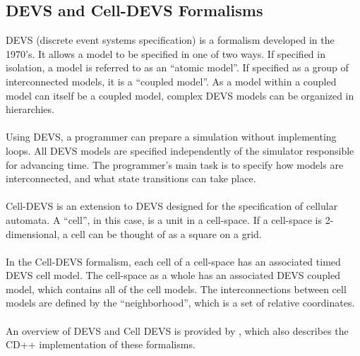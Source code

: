\documentclass{acm_proc_article-sp}
\begin{document}
\subsection{DEVS and Cell-DEVS Formalisms}
DEVS (discrete event systems specification) is a formalism
developed in the 1970's.  It allows a model to be specified
in one of two ways.  If specified in isolation, a model is 
referred to as an ``atomic model''.  If specified as a group of 
interconnected models, it is a ``coupled model''.  As a model 
within a coupled model
can itself be a coupled model, complex DEVS models can be
organized in hierarchies. \\
\\
Using DEVS, a programmer can prepare a simulation without 
implementing loops. All DEVS models are specified independently
of the simulator responsible for advancing time.  The programmer's
main task is to specify how models are interconnected, and what
state transitions can take place.\\
\\
Cell-DEVS is an extension to DEVS designed for the specification 
of cellular automata.  A ``cell'', in this case, is a unit in
a cell-space.  If a cell-space is 2-dimensional, a cell can be
thought of as a square on a grid. \\ 
\\
In the Cell-DEVS formalism, each cell of a cell-space has an
associated timed DEVS cell model.  The cell-space as a whole has
an associated DEVS coupled model, which contains all of the cell
models.  The interconnections between cell models are defined
by the ``neighborhood'', which is a set of relative coordinates. \\
\\
An overview of DEVS and Cell DEVS is provided by 
\cite{Wainer:CD++}, which also describes the CD++ 
implementation of these formalisms.
\end{document}
